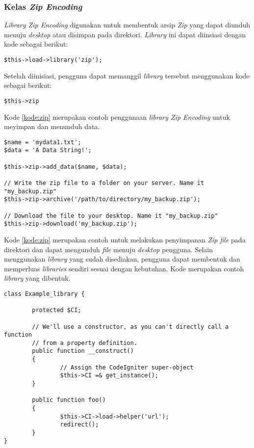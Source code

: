 \subsubsection{Kelas \textit{Zip Encoding}}
\textit{Library Zip Encoding} digunakan untuk membentuk arsip \textit{Zip} yang dapat diunduh menuju \textit{desktop} atau disimpan pada direktori. \textit{Library} ini dapat diinsiasi dengan kode sebagai berikut:

\begin{center}
\verb|$this->load->library('zip');|
\end{center}

Setelah diinisiasi, pengguna dapat memanggil \textit{library} tersebut menggunakan kode sebagai berikut:

\begin{center}
\verb|$this->zip|
\end{center}

Kode \ref{kode:zip} merupakan contoh penggunaan \textit{library Zip Encoding} untuk meyimpan dan menunduh data.

\begin{lstlisting}[caption=Contoh penggunaan \textit{library Zip Encoding}, label=kode:zip]
$name = 'mydata1.txt';
$data = 'A Data String!';

$this->zip->add_data($name, $data);

// Write the zip file to a folder on your server. Name it "my_backup.zip"
$this->zip->archive('/path/to/directory/my_backup.zip');

// Download the file to your desktop. Name it "my_backup.zip"
$this->zip->download('my_backup.zip');
\end{lstlisting}

Kode \ref{kode:zip} merupakan contoh untuk melakukan penyimpanan \textit{Zip file} pada direktori dan dapat mengunduh \textit{file} menuju \textit{desktop} pengguna. Selain menggunakan \textit{library} yang sudah disediakan, pengguna dapat membentuk dan memperluas \textit{libraries} sendiri sesuai dengan kebutuhan. Kode merupakan contoh \textit{library} yang dibentuk.

\begin{lstlisting}[caption=Contoh \textit{library} yang dibentuk, label=kode:newlib]
class Example_library {

        protected $CI;

        // We'll use a constructor, as you can't directly call a function
        // from a property definition.
        public function __construct()
        {
                // Assign the CodeIgniter super-object
                $this->CI =& get_instance();
        }

        public function foo()
        {
                $this->CI->load->helper('url');
                redirect();
        }
}
\end{lstlisting}

